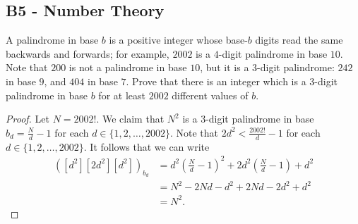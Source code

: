 \documentclass[11pt]{scrartcl}
\newcommand{\<}{\langle}
\renewcommand{\>}{\rangle}
\begin{document}
\subsection{B5 - Number Theory}
A palindrome in base $b$ is a positive integer whose base-$b$ digits read the same backwards and forwards; for example, $2002$ is a $4$-digit palindrome in base $10$. Note that $200$ is not a palindrome in base $10$, but it is a $3$-digit palindrome: $242$ in base $9$, and $404$ in base $7$. Prove that there is an integer which is a $3$-digit palindrome in base $b$ for at least $2002$ different values of $b$.
\begin{proof}
Let $N = 2002!$.  We claim that $N^2$ is a $3$-digit palindrome in base $b_d = \frac{N}{d} - 1$ for each $d \in \{1, 2, \dots, 2002\}$.  Note that $2d^2 < \frac{2002!}{d} - 1$ for each $d \in \{1, 2, \dots, 2002\}$.  It follows that we can write
\begin{align*}
([d^2][2d^2][d^2])_{b_d} &= d^2\left(\frac{N}{d} - 1 \right)^2 + 2d^2\left(\frac{N}{d} - 1 \right) + d^2 \\
&= N^2 - 2Nd - d^2 + 2Nd - 2d^2 + d^2 \\
&= N^2.
\end{align*}

\end{proof}
\pagebreak
\end{document}
